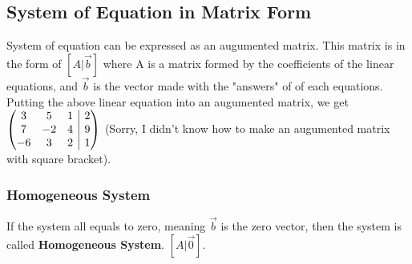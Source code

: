 \documentclass[12pt]{article}
\makeatletter
\newenvironment{amatrix}[1]{%
  \left(\begin{array}{@{}*{#1}{c}|c@{}}
}{%
  \end{array}\right)
}
\makeatother
\begin{document}
\subsection{System of Equation in Matrix Form}
System of equation can be expressed as an augumented matrix. This matrix is in the form of $[A|\vec{b}]$ where A is a matrix formed by the coefficients of the linear equations, and $\vec{b}$ is the vector made with the "answers" of of each equations. 
Putting the above linear equation into an augumented matrix, we get 
$
\begin{amatrix}{3}
   3 & 5 & 1 &2 \\ 7 & -2 &4 &9\\-6&3&2&1\\ 
 \end{amatrix}
$
(Sorry, I didn't know how to make an augumented matrix with square bracket).\\
\subsubsection{Homogeneous System}
If the system all equals to zero, meaning $\vec{b}$ is the zero vector, then the system is called \textbf{Homogeneous System}. $[A|\vec{0}]$.
\end{document}
